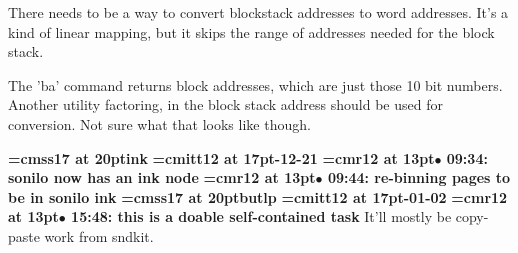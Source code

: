 There needs to be a way to convert blockstack addresses to word addresses. It's a kind of linear mapping, but it skips the range of addresses needed for the block stack.
\par

The 'ba' command returns block addresses, which are just those 10 bit numbers. Another utility factoring, in the block stack address should be used for conversion. Not sure what that looks like though.
\par

{\medskip\noindent\bf\font\titlefont=cmss17 at 20pt\titlefont ink}\medskip
{\medskip\noindent\bf\font\titlefont=cmitt12 at 17pt-12-21}\medskip
{\smallskip\noindent\bf\font\titlefont=cmr12 at 13pt\titlefont $\bullet$ 09:34: sonilo now has an ink node}\smallskip
{\smallskip\noindent\bf\font\titlefont=cmr12 at 13pt\titlefont $\bullet$ 09:44: re-binning pages to be in sonilo ink}\smallskip
{}
{\medskip\noindent\bf\font\titlefont=cmss17 at 20pt\titlefont butlp}\medskip
{\medskip\noindent\bf\font\titlefont=cmitt12 at 17pt-01-02}\medskip
{\smallskip\noindent\bf\font\titlefont=cmr12 at 13pt\titlefont $\bullet$ 15:48: this is a doable self-contained task}\smallskip
It'll mostly be copy-paste work from sndkit.
\par

\bye
